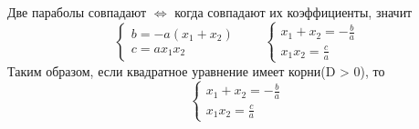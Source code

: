 \documentclass{article}
\begin{document}
\begin{enumerate}
        Две параболы совпадают \(\Leftrightarrow\) когда совпадают их коэффициенты, значит
        \begin{equation*}
            \begin{cases} b = -a(x_1+x_2)\\ c = ax_1x_2 \end{cases} \qquad \begin{cases} x_1+x_2=-\frac{b}{a}\\ x_1x_2=\frac{c}{a} \end{cases}
        \end{equation*}
        Таким образом, если квадратное уравнение имеет корни(D > 0), то
        \begin{equation*}
            \begin{cases}
                x_1+x_2=-\frac{b}{a}\\
                x_1x_2=\frac{c}{a}
            \end{cases}
        \end{equation*}
        
    \end{enumerate}
\end{document}
